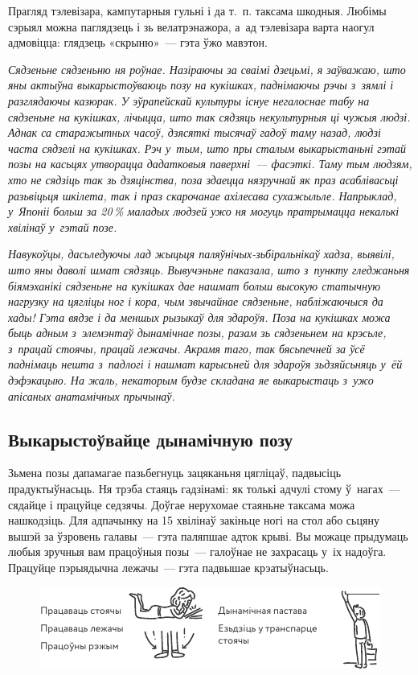 Прагляд тэлевізара, кампутарныя гульні і да т.~п. таксама шкодныя. Любімы сэрыял можна паглядзець і зь велатрэнажора, а~ад тэлевізара варта наогул адмовіцца: глядзець «скрыню»~--- гэта ўжо мавэтон.

\emph{Сядзеньне сядзеньню ня роўнае. Назіраючы за сваімі дзецьмі, я заўважаю, што яны актыўна выкарыстоўваюць позу на кукішках, паднімаючы рэчы з~зямлі і разглядаючы казюрак. У эўрапейскай культуры існуе негалоснае табу на сядзеньне на кукішках, лічыцца, што так сядзяць некультурныя ці чужыя людзі. Аднак са старажытных часоў, дзясяткі тысячаў гадоў таму назад, людзі часта сядзелі на кукішках. Рэч у~тым, што пры сталым выкарыстаньні гэтай позы на касьцях утворацца дадатковыя паверхні~--- фасэткі. Таму тым людзям, хто не сядзіць так зь дзяцінства, поза здаецца нязручнай як праз асаблівасьці разьвіцьця шкілета, так і праз скарочанае ахілесава сухажыльле. Напрыклад, у~Японіі больш за 20\,\% маладых людзей ужо ня могуць пратрымацца некалькі хвілінаў у~гэтай позе.}

\emph{Навукоўцы, дасьледуючы лад жыцьця па\-ляў\-ні\-чых-зьбі\-раль\-ні\-каў хадза, выявілі, што яны даволі шмат сядзяць. Вывучэньне паказала, што з~пункту гледжаньня біямэханікі сядзеньне на кукішках дае нашмат больш высокую статычную нагрузку на цягліцы ног і кора, чым звычайнае сядзеньне, набліжаючыся да хады! Гэта вядзе і да меншых рызыкаў для здароўя. Поза на кукішках можа быць адным з~элемэнтаў дынамічнае позы, разам зь сядзеньнем на крэсьле, з~працай стоячы, працай лежачы. Акрамя таго, так бясьпечней за ўсё паднімаць нешта з~падлогі і нашмат карысьней для здароўя зьдзяйсьняць у~ёй дэфэкацыю. На жаль, некаторым будзе складана яе выкарыстаць з~ужо апісаных анатамічных прычынаў.}

\subsection*{Выкарыстоўвайце дынамічную позу}

Зьмена позы дапамагае пазьбегнуць зацяканьня цягліцаў, падвысіць прадуктыўнасьць. Ня трэба стаяць гадзінамі: як толькі адчулі стому ў~нагах~--- сядайце і працуйце седзячы. Доўгае нерухомае стаяньне таксама можа нашкодзіць. Для адпачынку на 15 хвілінаў закіньце ногі на стол або сьцяну вышэй за ўзровень галавы~--- гэта паляпшае адток крыві. Вы можаце прыдумаць любыя зручныя вам працоўныя позы~--- галоўнае не захрасаць у~іх надоўга. Працуйце пэрыядычна лежачы~--- гэта падвышае крэатыўнасьць.

\begin{figure}[htb!]
  \centering
  \includegraphics[scale=1.5]{willpower/ch5/6.pdf}
\end{figure}

